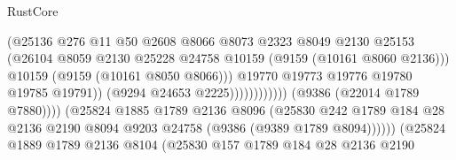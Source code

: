 \begin{lexlean}{RustCore}
\begin{coremodule}
                                                    (@25136
                                                      @276
                                                      @11
                                                      @50
                                                      @2608
                                                      @8066
                                                      @8073
                                                      @2323
                                                      @8049
                                                      @2130
                                                      @25153
                                                      (@26104
                                                        @8059
                                                        @2130
                                                        @25228
                                                        @24758
                                                        @10159
                                                        (@9159 (@10161 @8060 @2136)))
                                                      @10159
                                                      (@9159 (@10161 @8050 @8066)))
                                                    @19770
                                                    @19773
                                                    @19776
                                                    @19780
                                                    @19785
                                                    @19791))
                                                (@9294 @24653 @2225))))))))))))
                          (@9386 (@22014 @1789 @7880))))
                      (@25824
                        @1885
                        @1789
                        @2136
                        @8096
                        (@25830
                          @242
                          @1789
                          @184
                          @28
                          @2136
                          @2190
                          @8094
                          @9203
                          @24758
                          (@9386 (@9389 @1789 @8094))))))
                  (@25824
                    @1889
                    @1789
                    @2136
                    @8104
                    (@25830
                      @157
                      @1789
                      @184
                      @28
                      @2136
                      @2190

\end{coremodule}
\end{lexlean}
